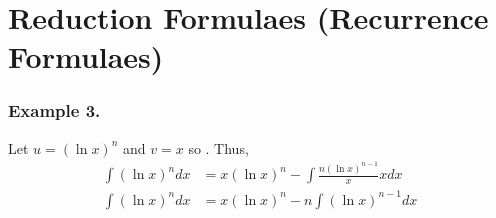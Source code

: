 \section{Reduction Formulaes (Recurrence Formulaes)}

\subsubsection{Example 3. }

Let $u = (\ln x)^n$ and $v = x$ so . Thus, 
\begin{align}
\int (\ln x)^n dx & = x(\ln x)^n - \int \frac{n (\ln x)^{n-1}}{x} x dx \\
\int (\ln x)^n dx & = x(\ln x)^n - n \int (\ln x)^{n-1} dx
\end{align}